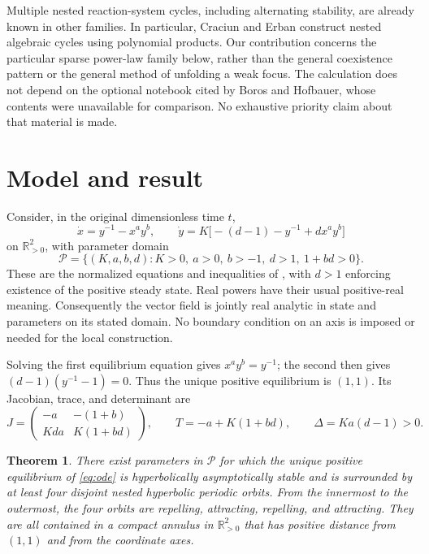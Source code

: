 \documentclass[11pt,a4paper]{article}
\newtheorem{theorem}{Theorem}
\theoremstyle{remark}
\newcommand{\R}{\mathbb R}
\numberwithin{equation}{section}
\begin{document}
Multiple nested reaction-system cycles, including alternating stability,
are already known in other families. In particular, Craciun and Erban
\cite[Theorem~1, equations~(4.27)--(4.30), and Section~5]{CraciunErban2025}
construct nested algebraic cycles using polynomial products. Our
contribution concerns the particular sparse power-law family below,
rather than the general coexistence pattern or the general method of
unfolding a weak focus. The calculation does not depend on the optional
notebook cited by Boros and Hofbauer, whose contents were unavailable for
comparison. No exhaustive priority claim about that material is made.

\section{Model and result}\label{sec:model}
Consider, in the original dimensionless time $t$,
\begin{equation}\label{eq:ode}
 \dot x=y^{-1}-x^a y^b,\qquad
 \dot y=K\bigl[-(d-1)-y^{-1}+d x^a y^b\bigr]
\end{equation}
on $\R_{>0}^2$, with parameter domain
\begin{equation}\label{eq:domain}
 \mathcal P=\{(K,a,b,d):K>0,\ a>0,\ b>-1,\ d>1,\ 1+bd>0\}.
\end{equation}
These are the normalized equations and inequalities of
\cite[Section~5.1]{BorosHofbauer2024}, with $d>1$ enforcing existence of
the positive steady state. Real powers have their usual positive-real
meaning. Consequently the vector field is jointly real analytic in
state and parameters on its stated domain. No boundary condition on an
axis is imposed or needed for the local construction.

Solving the first equilibrium equation gives $x^a y^b=y^{-1}$; the second
then gives $(d-1)(y^{-1}-1)=0$. Thus the unique positive equilibrium is
$(1,1)$. Its Jacobian, trace, and determinant are
\begin{equation}\label{eq:linear}
 J=\begin{pmatrix}-a&-(1+b)\\Kda&K(1+bd)\end{pmatrix},\qquad
 T=-a+K(1+bd),\qquad \Delta=Ka(d-1)>0.
\end{equation}

\begin{theorem}\label{thm:main}
There exist parameters in $\mathcal P$ for which the unique positive
equilibrium of \eqref{eq:ode} is hyperbolically asymptotically stable
and is surrounded by at least four disjoint nested hyperbolic periodic
orbits. From the innermost to the outermost, the four orbits are repelling,
attracting, repelling, and attracting. They are all contained in a compact
annulus in $\R_{>0}^2$ that has positive distance from $(1,1)$ and from
the coordinate axes.
\end{theorem}
\end{document}
